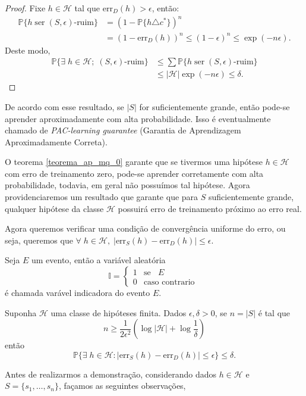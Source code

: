 \begin{proof}
Fixe $h \in \mathcal{H}$ tal que $\mathrm{err}_D(h) > \epsilon$, então:
\begin{align*}
    \mathbb{P}\{h \; \text{ser} \; (S, \epsilon)\text{-ruim}\} &= \left(1 - \mathbb{P}\{h \triangle c^*\}\right)^n \\
    &=(1 - \mathrm{err}_D(h))^n \leq (1 - \epsilon)^n \leq \exp(-n\epsilon).
\end{align*}
Deste modo,
\begin{align*}
\mathbb{P}\{\exists \; h \in \mathcal{H}; \; (S, \epsilon)\text{-ruim}\} &\leq \sum{\mathbb{P}\{h \; \text{ser} \; (S, \epsilon)\text{-ruim}\}} \\
&\leq |\mathcal{H}|\exp(-n\epsilon) \leq \delta.
\end{align*}
\end{proof}{}

De acordo com esse resultado, se $|S|$ for suficientemente grande, então pode-se aprender aproximadamente com alta probabilidade. Isso é eventualmente chamado de \emph{PAC-learning guarantee} (Garantia de Aprendizagem Aproximadamente Correta).

O teorema \ref{teorema_ap_mq_0} garante que se tivermos uma hipótese $h \in \mathcal{H}$ com erro de treinamento zero, pode-se aprender corretamente com alta probabilidade, todavia, em geral não possuímos tal hipótese. Agora providenciaremos um resultado que garante que para $S$ suficientemente grande, qualquer hipótese da classe $\mathcal{H}$ possuirá erro de treinamento próximo ao erro real.


Agora queremos verificar uma condição de convergência uniforme do erro, ou seja, queremos que $\forall \; h \in \mathcal{H}, \; |\mathrm{err}_S(h) - \mathrm{err}_D(h)| \leq \epsilon$.

\begin{definicao}
Seja $E$ um evento, então a variável aleatória
\[
   \mathbb{I} = 
  \begin{cases} 
   1 & \text{se } \;\; E \\
   0       & \text{caso contrario }
  \end{cases}
\]
é chamada varável indicadora do evento $E$.
\end{definicao}

\begin{teorema}
\label{teorema_ap_mq_1}
Suponha $\mathcal{H}$ uma classe de hipóteses finita. Dados  $\epsilon, \delta > 0$, se $n = |S|$ é tal que
\begin{equation*}
n \geq \frac{1}{2\epsilon^2}\left(\log{|\mathcal{H}|} + \log{\frac{1}{\delta}}\right)
\end{equation*}{}
então
\begin{equation*}
    \mathbb{P} \{\exists \; h \in \mathcal{H} :|\mathrm{err}_S(h) - \mathrm{err}_D(h)| \leq \epsilon\} \leq \delta.
\end{equation*}{}
\end{teorema}
Antes de realizarmos a demonstração, considerando dados $h \in \mathcal{H}$ e $S = \{s_1, \dots, s_n\}$, façamos as seguintes observações, 

